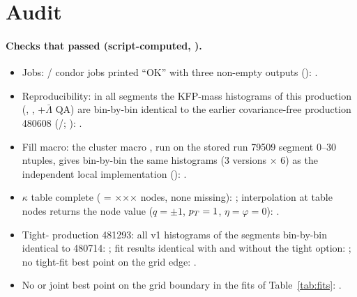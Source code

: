 \section{Audit}
\label{sec:audit}

\paragraph{Checks that passed (script-computed, ).}
\begin{itemize}
\item Jobs: \JobsOk/\JobsN{} condor jobs printed ``OK'' with three non-empty outputs (): \ChkJobs.
\item Reproducibility: in all \ReproN{} segments the KFP-mass histograms of this production (, ,
  \La+$\bar\Lambda$ QA) are bin-by-bin identical to the earlier covariance-free production 480608 (\ReproSame/\ReproN;
  ): \ChkRepro.
\item Fill macro: the cluster macro , run on the stored run 79509 segment 0--30 ntuples, gives
  bin-by-bin the same \ChkFillN{} histograms (3 versions $\times$ 6) as the independent local implementation
   (): \ChkFill.
\item $\kappa$ table complete (\TabRows{} = \TabNq$\times$\TabNpt$\times$\TabNeta$\times$\TabNphi{} nodes, none missing):
  \ChkTable; interpolation at table nodes returns the node value ($q=\pm1$, $p_T=1$\gevc, $\eta=\varphi=0$): \ChkInterp.
\item Tight-\La{} production 481293: all v1 histograms of the \ReproTwoN{} segments bin-by-bin identical to 480714: \ChkReproTwo;
  \Ks{} fit results identical with and without the tight \La{} option: \ChkKsSame; no tight-fit best point on the grid edge:
  \ChkEdgeTight.
\item No \Ks{} or joint best point on the grid boundary in the fits of Table~\ref{tab:fits}: \ChkEdge.
\end{itemize}

